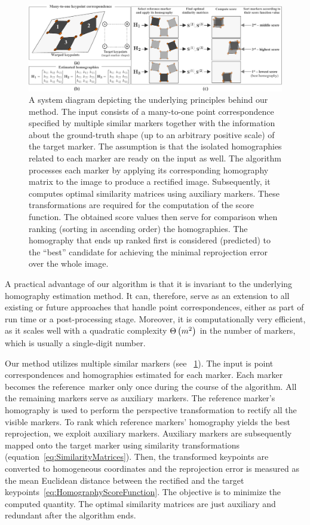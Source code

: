 \begin{figure}[t]
    \centerline{\includegraphics[width=\linewidth]{figures/homography/system_diagram.pdf}}
    \caption[Homography ranking system diagram]{A system diagram depicting the underlying principles behind our method.  The input consists of a many-to-one point correspondence specified by multiple similar markers together with the information about the ground-truth shape (up to an arbitrary positive scale) of the target marker.  The assumption is that the isolated homographies related to each marker are ready on the input as well.  The algorithm processes each marker by applying its corresponding homography matrix to the image to produce a rectified image. Subsequently, it computes optimal similarity matrices using auxiliary markers. These transformations are required for the computation of the score function. The obtained score values then serve for comparison when ranking (sorting in ascending order) the homographies. The homography that ends up ranked first is considered (predicted) to the ``best'' candidate for achieving the minimal reprojection error over the whole image.}
    \label{fig:HomographySystemDiagram}
\end{figure}

A practical advantage of our algorithm is that it is invariant to the underlying homography estimation method. It can, therefore, serve as an extension to all existing or future approaches that handle point correspondences, either as part of run time or a post-processing stage. Moreover, it is computationally very efficient, as it scales well with a quadratic complexity ${\Theta} \left( m^2 \right)$ in the number of markers, which is usually a single-digit number.

Our method utilizes multiple similar markers (see \figstr{}~\ref{fig:HomographySystemDiagram}). The input is point correspondences and homographies estimated for each marker. Each marker becomes the \mbox{reference marker} only once during the course of the algorithm. All the remaining markers serve as \mbox{auxiliary markers}. The reference marker's homography is used to perform the perspective transformation to rectify all the visible markers. To rank which reference markers' homography yields the best reprojection, we exploit auxiliary markers. Auxiliary markers are subsequently mapped onto the target marker using similarity transformations (equation~\ref{eq:SimilarityMatrices}). Then, the transformed keypoints are converted to homogeneous coordinates and the reprojection error is measured as the mean Euclidean distance between the rectified and the target keypoints~\ref{eq:HomographyScoreFunction}. The objective is to minimize the computed quantity. The optimal similarity matrices are just auxiliary and redundant after the algorithm ends.

